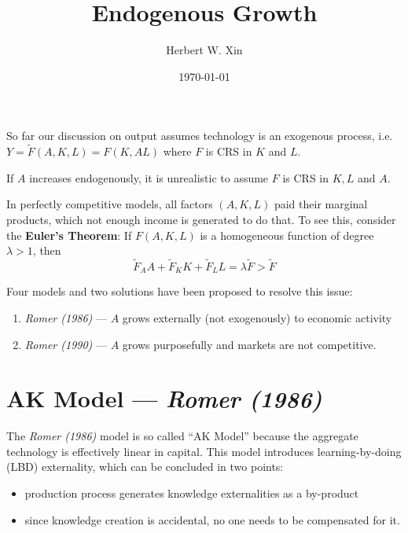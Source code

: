\documentclass[twocolumn, fleqn]{article}
\begin{document}
	\title{Endogenous Growth}
	\author{Herbert W. Xin}
	\date{\today}
	\maketitle

	\tableofcontents
	\thispagestyle{fancy}

	So far our discussion on output assumes technology is an exogenous process, i.e. $Y = \tilde{F}(A,K,L) = F(K,AL)$ where $F$ is CRS in $K$ and $L$.

	If $A$ increases endogenously, it is unrealistic to assume $F$ is CRS in $K,L$ and $A$.

	In perfectly competitive models, all factors $(A,K,L)$ paid their marginal products, which not enough income is
	generated to do that.
	To see this, consider the \textbf{Euler's Theorem}: If $F(A,K,L)$ is a homogeneous function of degree $\lambda>1$, then \[\tilde{F}_A A + \tilde{F}_K K + \tilde{F}_L L = \lambda \tilde{F} > \tilde{F} \]

	Four models and two solutions have been proposed to resolve this issue:
	\begin{enumerate}
		\item \textit{Romer (1986)} --- $A$ grows externally (not exogenously) to economic activity
		\item \textit{Romer (1990)} --- $A$ grows purposefully and markets are not competitive.
	\end{enumerate}

	\section{AK Model --- \textit{Romer (1986)}}\label{sec:ak-model}
		The \textit{Romer (1986)} model is so called ``AK Model'' because the aggregate technology is effectively
		linear in capital.
		This model introduces learning-by-doing (LBD) externality, which can be concluded in two points:
		\begin{itemize}
			\item production process generates knowledge externalities as a by-product
			\item since knowledge creation is accidental, no one needs to be compensated for it.
		\end{itemize}
\end{document}
